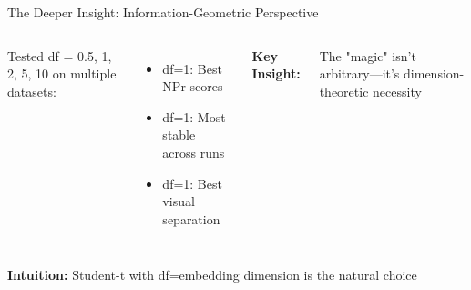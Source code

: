 \documentclass[aspectratio=169]{beamer}
\newcommand{\intuition}[1]{\colorbox{green!10}{\textcolor{intuitioncolor}{\textbf{Intuition:} #1}}}
\begin{document}
\begin{frame}{The Deeper Insight: Information-Geometric Perspective}
\begin{columns}
Tested df = 0.5, 1, 2, 5, 10 on multiple datasets:
\begin{itemize}
\item df=1: Best NPr scores
\item df=1: Most stable across runs
\item df=1: Best visual separation
\end{itemize}

\textbf{Key Insight:}

The "magic" isn't arbitrary—it's dimension-theoretic necessity
\end{columns}

\vspace{0.3cm}
\intuition{Student-t with df=embedding dimension is the natural choice}
\end{frame}

\end{document}
